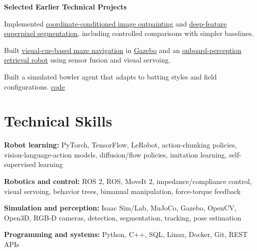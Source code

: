 \documentclass[10pt]{article}
\renewcommand{\evidence}[2]{\nobreak\hspace{0.15em}\mbox{\footnotesize\href{#1}{#2}}}
\begin{document}
\par\vspace{5pt}\textbf{Selected Earlier Technical Projects}\par
{}
\begin{compactitems}
  \item Implemented \href{https://github.com/tvpian/Image-Outpainting}{coordinate-conditioned image outpainting} and \href{https://github.com/tvpian/SLIC-Image-Segmentation}{deep-feature superpixel segmentation}, including controlled comparisons with simpler baselines.
\end{compactitems}

\begin{compactitems}
  \item Built \href{https://github.com/tvpian/Maze_Runner}{visual-cue-based maze navigation} in \href{https://github.com/tvpian/Maze_Solver}{Gazebo} and an \href{https://youtu.be/5vNxQM7fV6A}{onboard-perception retrieval robot} using sensor fusion and visual servoing.
\end{compactitems}

\begin{compactitems}
  \item Built a simulated bowler agent that adapts to batting styles and field configurations. \evidence{https://github.com/tvpian/RL_Cricket_Simulation_Engine}{code}
\end{compactitems}

\newpage

\section{Technical Skills}
\textbf{Robot learning:} PyTorch, TensorFlow, LeRobot, action-chunking policies, vision-language-action models, diffusion/flow policies, imitation learning, self-supervised learning\par\vspace{2pt}
\textbf{Robotics and control:} ROS 2, ROS, MoveIt 2, impedance/compliance control, visual servoing, behavior trees, bimanual manipulation, force-torque feedback\par\vspace{2pt}
\textbf{Simulation and perception:} Isaac Sim/Lab, MuJoCo, Gazebo, OpenCV, Open3D, RGB-D cameras, detection, segmentation, tracking, pose estimation\par\vspace{2pt}
\textbf{Programming and systems:} Python, C++, SQL, Linux, Docker, Git, REST APIs
\end{document}
